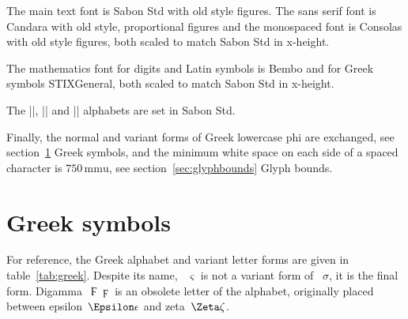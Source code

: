 \documentclass{ltxdockit}
\begin{document}
The main text font is Sabon  Std with old style figures. The
sans serif font is Candara with old style, proportional figures and
the monospaced font is Consolas with old style figures, both scaled to
match Sabon  Std in x-height.

The mathematics font for digits and Latin symbols is Bembo 
and for Greek symbols STIXGeneral, both scaled to match Sabon 
Std in x-height.

The |\mathrm|, |\mathit| and |\mathbf| alphabets are set in Sabon
 Std.

Finally, the normal and variant forms of Greek lowercase phi are
exchanged, see section~\ref{sec:greek} Greek symbols, and the minimum
white space on each side of a spaced character is $750\,\mathrm{mmu}$,
see section~\ref{sec:glyphbounds} Glyph bounds.

\section{Greek symbols}\label{sec:greek}

For reference, the Greek alphabet and variant letter forms are given
in table~\ref{tab:greek}. Despite its name, ~$\varsigma$
is not a variant form of ~$\sigma$, it is the final
form. Digamma~$\Digamma\digamma$ is an obsolete letter of the
alphabet, originally placed between epsilon~$\Epsilon\epsilon$ and
zeta~$\Zeta\zeta$.
\end{document}
